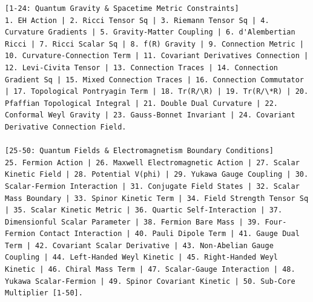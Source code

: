 \documentclass[11pt,a4paper]{article}
\begin{document}
\begin{tcolorbox}
\begin{lstlisting}[basicstyle=\scriptsize\ttfamily, breaklines=true, columns=fullflexible]
[1-24: Quantum Gravity & Spacetime Metric Constraints]
1. EH Action | 2. Ricci Tensor Sq | 3. Riemann Tensor Sq | 4. Curvature Gradients | 5. Gravity-Matter Coupling | 6. d'Alembertian Ricci | 7. Ricci Scalar Sq | 8. f(R) Gravity | 9. Connection Metric | 10. Curvature-Connection Term | 11. Covariant Derivatives Connection | 12. Levi-Civita Tensor | 13. Connection Traces | 14. Connection Gradient Sq | 15. Mixed Connection Traces | 16. Connection Commutator | 17. Topological Pontryagin Term | 18. Tr(R/\R) | 19. Tr(R/\*R) | 20. Pfaffian Topological Integral | 21. Double Dual Curvature | 22. Conformal Weyl Gravity | 23. Gauss-Bonnet Invariant | 24. Covariant Derivative Connection Field.

[25-50: Quantum Fields & Electromagnetism Boundary Conditions]
25. Fermion Action | 26. Maxwell Electromagnetic Action | 27. Scalar Kinetic Field | 28. Potential V(phi) | 29. Yukawa Gauge Coupling | 30. Scalar-Fermion Interaction | 31. Conjugate Field States | 32. Scalar Mass Boundary | 33. Spinor Kinetic Term | 34. Field Strength Tensor Sq | 35. Scalar Kinetic Metric | 36. Quartic Self-Interaction | 37. Dimensionful Scalar Parameter | 38. Fermion Bare Mass | 39. Four-Fermion Contact Interaction | 40. Pauli Dipole Term | 41. Gauge Dual Term | 42. Covariant Scalar Derivative | 43. Non-Abelian Gauge Coupling | 44. Left-Handed Weyl Kinetic | 45. Right-Handed Weyl Kinetic | 46. Chiral Mass Term | 47. Scalar-Gauge Interaction | 48. Yukawa Scalar-Fermion | 49. Spinor Covariant Kinetic | 50. Sub-Core Multiplier [1-50].


\end{lstlisting}
\end{tcolorbox}
\end{document}
